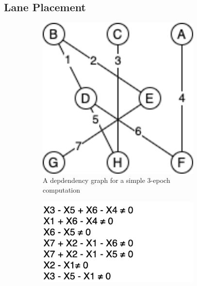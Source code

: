 \subsection{Lane Placement}\label{sec:lane-placement}
\begin{figure}
    \begin{subfigure}{0.24\textwidth}
        \includegraphics[width=0.9\textwidth]{figures/hypergraph_coloring/small_dependency_graph.drawio.png}
        \caption{A depdendency graph for a simple 3-epoch computation}\label{fig:dependence-graph}
    \end{subfigure}
    \begin{subfigure}{0.24\textwidth}
        \includegraphics[width=0.9\textwidth]{figures/hypergraph_coloring/hypergraph_relations.drawio.png}

\end{subfigure}
\end{figure}
